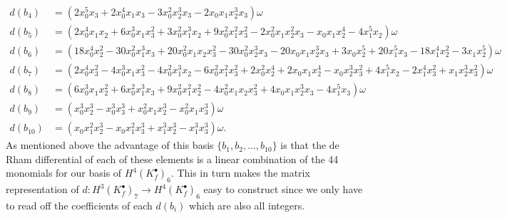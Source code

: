 \documentclass[10pt,oneside,reqno]{amsart}
\begin{document}
\begin{flushleft}
\begin{align*}
			d(b_4) & =(2x_0^5x_3+2x_0^4x_1x_3-3x_0^2x_2^3x_3-2x_0x_1x_2^3x_3)\omega \\
			d(b_5) & =(2x_0^4x_1x_2+6x_0^3x_1x_3^2+3x_0^2x_1^3x_2+9x_0^2x_1^2x_3^2-2x_0^2x_1x_2^2x_3-x_0x_1x_2^4-4x_1^5x_2)\omega \\
			d(b_6) & =(18x_0^4x_2^2-30x_0^2x_1^3x_3+20x_0^2x_1x_2x_3^2-30x_0^2x_2^3x_3-20x_0x_1x_2^3x_3+3x_0x_2^5+20x_1^5x_3-18x_1^4x_2^2-3x_1x_2^5)\omega \\
			d(b_7) & =(2x_0^4x_3^2-4x_0^3x_1x_3^2-4x_0^2x_1^3x_2-6x_0^2x_1^2x_3^2+2x_0^2x_2^4+2x_0x_1x_2^4-x_0x_2^3x_3^2+4x_1^5x_2-2x_1^4x_3^2+x_1x_2^3x_3^2)\omega \\
			d(b_8) & =(6x_0^3x_1x_2^2+6x_0^2x_1^3x_3+9x_0^2x_1^2x_2^2-4x_0^2x_1x_2x_3^2+4x_0x_1x_2^3x_3-4x_1^5x_3)\omega \\
			d(b_9) & =(x_0^3x_2^3-x_0^3x_3^3+x_0^2x_1x_2^3-x_0^2x_1x_3^3)\omega \\
			d(b_{10}) & =(x_0x_1^2x_2^3-x_0x_1^2x_3^3+x_1^3x_2^3-x_1^3x_3^3)\omega.
		\end{align*}
		As mentioned above the advantage of this basis $\{b_1,b_2,\dots,b_{10}\}$ is that the de Rham differential of each of these elements is a linear combination of the 44 monomials for our basis of $H^4(K_f^{\bullet})_6$.  This in turn makes the matrix representation of $d:H^3(K_f^{\bullet})_7\rightarrow H^4(K_f^{\bullet})_6$ easy to construct since we only have to read off the coefficients of each $d(b_i)$ which are also all integers.
	\end{flushleft}
\end{document}
